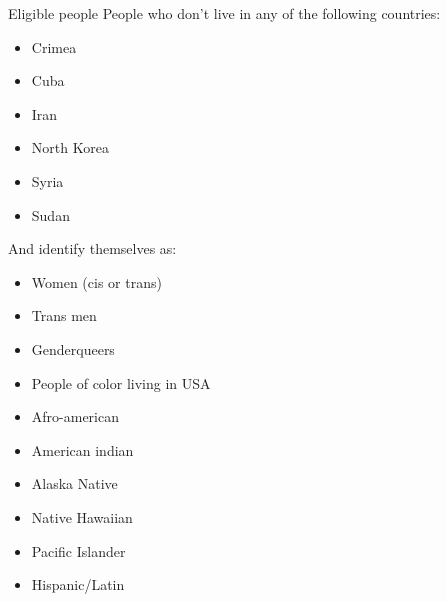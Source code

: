 \documentclass[pdf]{beamer}
\begin{document}
\begin{frame}{Eligible people}
  People who don't live in any of the following countries:
  \linebreak

  \begin{minipage}{.45\linewidth}
    \begin{itemize}
        \item Crimea
        \item Cuba
        \item Iran
    \end{itemize}
  \end{minipage}
  \hspace{.05\linewidth}
  \begin{minipage}{.45\linewidth}
    \begin{itemize}
        \item North Korea
        \item Syria
        \item Sudan
    \end{itemize}
  \end{minipage}

  \vspace{1em}
  And identify themselves as:
  \begin{itemize}
    \item Women (cis or trans)
    \item Trans men
    \item Genderqueers
    \item People of color living in USA
  \end{itemize}

  \begin{center}
    \begin{minipage}{.45\linewidth}
      \begin{itemize}
        \item Afro-american
        \item American indian
        \item Alaska Native
      \end{itemize}
    \end{minipage}
    \hspace{.05\linewidth}
    \begin{minipage}{.45\linewidth}
      \begin{itemize}
        \item Native Hawaiian
        \item Pacific Islander
        \item Hispanic/Latin
      \end{itemize}
    \end{minipage}
  \end{center}
\end{frame}
\end{document}

